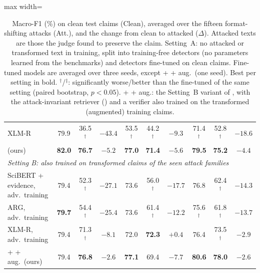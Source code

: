 \begin{table}[t]
\begin{adjustbox}{max width=\textwidth}
\begin{tabular}{lccccccccc}
\quad XLM-R \citep{conneau2020xlmr} & 79.9 & 36.5$^{\dagger}$ & $-43.4$ & 53.5$^{\dagger}$ & 44.2$^{\dagger}$ & $-9.3$ & 71.4$^{\dagger}$ & 52.8$^{\dagger}$ & $-18.6$ \\
\quad \method{} (ours) & \textbf{82.0} & \textbf{76.7} & $-5.2$ & \textbf{77.0} & \textbf{71.4} & $-5.6$ & \textbf{79.5} & \textbf{75.2} & $-4.4$ \\
\midrule
\multicolumn{10}{l}{\emph{Setting B: also trained on transformed claims of the seen attack families}} \\
SciBERT + evidence, adv.\ training \citep{kotonya2020pubhealth} & 79.4 & 52.3$^{\dagger}$ & $-27.1$ & 73.6 & 56.0$^{\dagger}$ & $-17.7$ & 76.8 & 62.4$^{\dagger}$ & $-14.3$ \\
ARG, adv.\ training \citep{hu2024arg} & \textbf{79.7} & 54.4$^{\dagger}$ & $-25.4$ & 73.6 & 61.4$^{\dagger}$ & $-12.2$ & 75.6$^{\dagger}$ & 61.8$^{\dagger}$ & $-13.7$ \\
XLM-R, adv.\ training \citep{conneau2020xlmr} & 79.4 & 71.3$^{\dagger}$ & $-8.1$ & 72.0 & \textbf{72.3} & $+0.4$ & 76.4 & 73.5$^{\dagger}$ & $-2.9$ \\
\method{} + \air{} + aug.\ (ours) & 79.4 & \textbf{76.8} & $-2.6$ & \textbf{77.1} & 69.4 & $-7.7$ & \textbf{80.6} & \textbf{78.0} & $-2.6$ \\
\bottomrule
\end{tabular}\end{adjustbox}
\caption{Macro-F1 (\%) on clean test claims (Clean), averaged over the fifteen format-shifting attacks (Att.), and the change from clean to attacked ($\Delta$). Attacked texts are those the judge found to preserve the claim. Setting~A: no attacked or transformed text in training, split into training-free detectors (no parameters learned from the benchmarks) and detectors fine-tuned on clean claims. Fine-tuned models are averaged over three seeds, except \method{} + \air{} + aug.\ (one seed). Best per setting in bold. $^{\dagger}$/$^{\ddagger}$: significantly worse/better than the fine-tuned \method{} of the same setting (paired bootstrap, $p<0.05$). \method{} + \air{} + aug.: the Setting~B variant of \method{}, with the attack-invariant retriever (\air{}) and a verifier also trained on the transformed (augmented) training claims.}
\label{tab:main}
\end{table}

